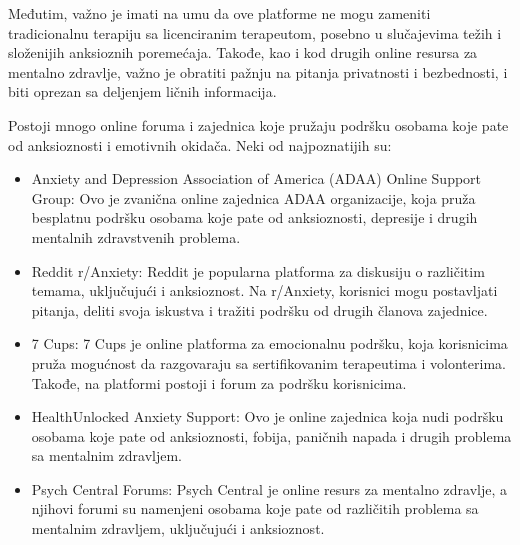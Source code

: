 \documentclass[a4paper]{article}
\begin{document}
Međutim, važno je imati na umu da ove platforme ne mogu zameniti tradicionalnu terapiju sa licenciranim terapeutom, posebno u slučajevima težih i složenijih anksioznih poremećaja. Takođe, kao i kod drugih online resursa za mentalno zdravlje, važno je obratiti pažnju na pitanja privatnosti i bezbednosti, i biti oprezan sa deljenjem ličnih informacija.

Postoji mnogo online foruma i zajednica koje pružaju podršku osobama koje pate od anksioznosti i emotivnih okidača. Neki od najpoznatijih su:
\begin{itemize}
\item Anxiety and Depression Association of America (ADAA) Online Support Group\cite{sesta}: Ovo je zvanična online zajednica ADAA organizacije, koja pruža besplatnu podršku osobama koje pate od anksioznosti, depresije i drugih mentalnih zdravstvenih problema.
\item Reddit r/Anxiety: Reddit je popularna platforma za diskusiju o različitim temama, uključujući i anksioznost. Na r/Anxiety, korisnici mogu postavljati pitanja, deliti svoja iskustva i tražiti podršku od drugih članova zajednice.
\item 7 Cups\cite{sedma}: 7 Cups je online platforma za emocionalnu podršku, koja korisnicima pruža mogućnost da razgovaraju sa sertifikovanim terapeutima i volonterima. Takođe, na platformi postoji i forum za podršku korisnicima.
\item HealthUnlocked Anxiety Support\cite{osma}: Ovo je online zajednica koja nudi podršku osobama koje pate od anksioznosti, fobija, paničnih napada i drugih problema sa mentalnim zdravljem.
\item Psych Central Forums\cite{deveta}: Psych Central je online resurs za mentalno zdravlje, a njihovi forumi su namenjeni osobama koje pate od različitih problema sa mentalnim zdravljem, uključujući i anksioznost.
\end{itemize}
\end{document}
